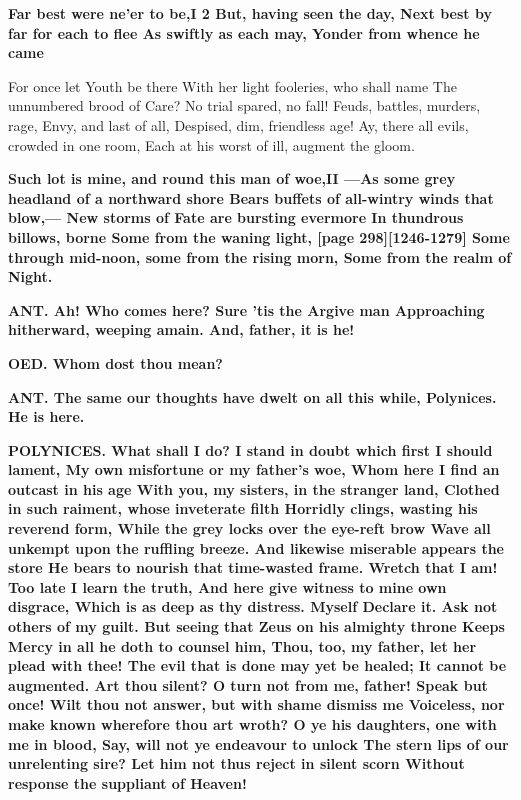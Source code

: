 \documentclass[11pt,letter]{book}
\begin{document}
\par \textbf{Far best were ne’er to be,I 2 But, having seen the day, Next best by far for each to flee As swiftly as each may, Yonder from whence he came}
\par   For once let Youth be there With her light fooleries, who shall name The unnumbered brood of Care? No trial spared, no fall! Feuds, battles, murders, rage, Envy, and last of all, Despised, dim, friendless age! Ay, there all evils, crowded in one room, Each at his worst of ill, augment the gloom.

\par \textbf{Such lot is mine, and round this man of woe,II —As some grey headland of a northward shore Bears buffets of all-wintry winds that blow,— New storms of Fate are bursting evermore In thundrous billows, borne Some from the waning light, [page 298][1246-1279] Some through mid-noon, some from the rising morn, Some from the realm of Night.}
\par 

\par \textbf{ANT. Ah! Who comes here? Sure ’tis the Argive man Approaching hitherward, weeping amain. And, father, it is he!}
\par 

\par \textbf{OED. Whom dost thou mean?}
\par 

\par \textbf{ANT. The same our thoughts have dwelt on all this while, Polynices. He is here.}
\par 

\par \textbf{POLYNICES. What shall I do? I stand in doubt which first I should lament, My own misfortune or my father’s woe, Whom here I find an outcast in his age With you, my sisters, in the stranger land, Clothed in such raiment, whose inveterate filth Horridly clings, wasting his reverend form, While the grey locks over the eye-reft brow Wave all unkempt upon the ruffling breeze. And likewise miserable appears the store He bears to nourish that time-wasted frame. Wretch that I am! Too late I learn the truth, And here give witness to mine own disgrace, Which is as deep as thy distress. Myself Declare it. Ask not others of my guilt. But seeing that Zeus on his almighty throne Keeps Mercy in all he doth to counsel him, Thou, too, my father, let her plead with thee! The evil that is done may yet be healed; It cannot be augmented. Art thou silent? O turn not from me, father! Speak but once! Wilt thou not answer, but with shame dismiss me Voiceless, nor make known wherefore thou art wroth? O ye his daughters, one with me in blood, Say, will not ye endeavour to unlock The stern lips of our unrelenting sire? Let him not thus reject in silent scorn Without response the suppliant of Heaven!}
\par 
\end{document}
